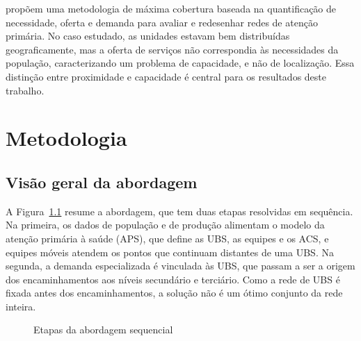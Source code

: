 \documentclass[12pt,a4paper,oneside]{report}
\newcommand{\fonte}[1]{\par\vspace{4pt}{\footnotesize\centering Fonte: #1\par}}
\begin{document}
\citet{elorza2022} propõem uma metodologia de máxima cobertura baseada na quantificação de necessidade,
oferta e demanda para avaliar e redesenhar redes de atenção primária. No caso estudado, as unidades
estavam bem distribuídas geograficamente, mas a oferta de serviços não correspondia às necessidades da
população, caracterizando um problema de capacidade, e não de localização. Essa distinção entre
proximidade e capacidade é central para os resultados deste trabalho.

\chapter{Metodologia}

\section{Visão geral da abordagem}
A Figura~\ref{fig:fluxo} resume a abordagem, que tem duas etapas resolvidas em sequência. Na primeira,
os dados de população e de produção alimentam o modelo da atenção primária à saúde (APS), que define as
UBS, as equipes e os ACS, e equipes móveis atendem os pontos que continuam distantes de uma UBS. Na
segunda, a demanda especializada é vinculada às UBS, que passam a ser a origem dos encaminhamentos aos
níveis secundário e terciário. Como a rede de UBS é fixada antes dos encaminhamentos, a solução não é um
ótimo conjunto da rede inteira.

\begin{figure}[htbp]\centering
{}
\caption{Etapas da abordagem sequencial}\label{fig:fluxo}
\fonte{Elaboração própria.}
\end{figure}
\end{document}
